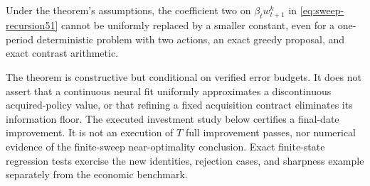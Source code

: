 \begin{proposition}
\label{prop:sharp-width51}
Under the theorem's assumptions, the coefficient two on
$\beta_tw_{t+1}^k$ in \eqref{eq:sweep-recursion51} cannot be uniformly
replaced by a smaller constant, even for a one-period deterministic problem
with two actions, an exact greedy proposal, and exact contrast arithmetic.
\end{proposition}

The theorem is constructive but conditional on verified error budgets. It
does not assert that a continuous neural fit uniformly approximates a
discontinuous acquired-policy value, or that refining a fixed acquisition
contract eliminates its information floor. The executed investment study
below certifies a final-date improvement. It is not an execution of $T$
full improvement passes, nor numerical evidence of the finite-sweep
near-optimality conclusion. Exact finite-state regression tests exercise the
new identities, rejection cases, and sharpness example separately from the
economic benchmark.
